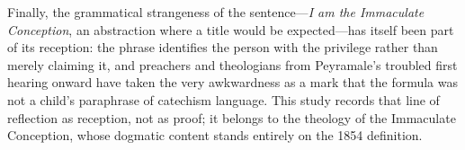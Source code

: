 Finally, the grammatical strangeness of the sentence---\emph{I am
the Immaculate Conception}, an abstraction where a title would be
expected---has itself been part of its reception: the phrase
identifies the person with the privilege rather than merely
claiming it, and preachers and theologians from Peyramale's
troubled first hearing onward have taken the very awkwardness as a
mark that the formula was not a child's paraphrase of catechism
language. This study records that line of reflection as reception,
not as proof; it belongs to the theology of the Immaculate
Conception, whose dogmatic content stands entirely on the 1854
definition.

